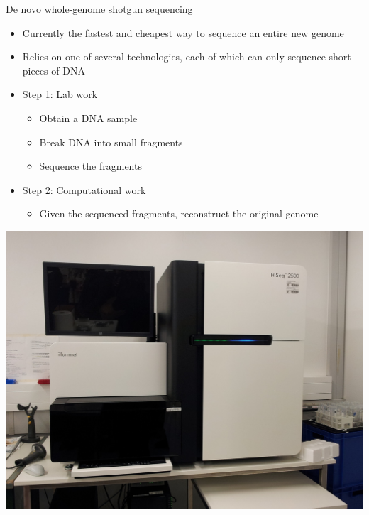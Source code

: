 \documentclass[xcolor=dvipsnames]{beamer}
\begin{document}
\begin{frame}{De novo whole-genome shotgun sequencing}
    \begin{minipage}{0.66\textwidth}
        \begin{itemize}
            \item Currently the fastest and cheapest way to sequence an entire
                  new genome
            \item Relies on one of several technologies, each of which can only
                sequence short pieces of DNA
            \item Step 1: Lab work
                \begin{itemize}
                    \item Obtain a DNA sample
                    \item Break DNA into small fragments
                    \item Sequence the fragments
                \end{itemize}
            \item Step 2: Computational work
                \begin{itemize}
                    \item Given the sequenced fragments, reconstruct the original genome
                \end{itemize}
        \end{itemize}
    \end{minipage}
    \begin{minipage}{0.32\textwidth}
        \begin{center}
            \includegraphics[width=1.0\textwidth]{Illumina_HiSeq_2500.jpg} \\

\end{center}
\end{minipage}
\end{frame}
\end{document}
